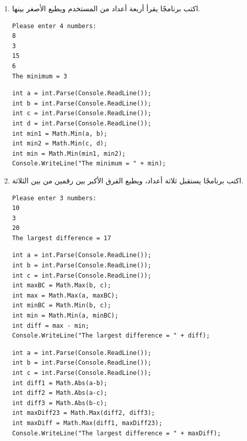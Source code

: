 \documentclass[14pt]{extarticle}
\begin{document}
\begin{enumerate}[itemsep=3em]
    \item
    اكتب برنامجًا يقرأ أربعة أعداد من المستخدم ويطبع الأصغر بينها.
    \ifdetailed
    \begin{boxExample}
    \begin{english}
    \begin{verbatim}
Please enter 4 numbers:
8
3
15
6
The minimum = 3
    \end{verbatim}
    \end{english}
    \end{boxExample}
    \ifwithsols
    \begin{boxSolution}
    \begin{english}
    \begin{verbatim}
int a = int.Parse(Console.ReadLine());
int b = int.Parse(Console.ReadLine());
int c = int.Parse(Console.ReadLine());
int d = int.Parse(Console.ReadLine());
int min1 = Math.Min(a, b);
int min2 = Math.Min(c, d);
int min = Math.Min(min1, min2);
Console.WriteLine("The minimum = " + min);
    \end{verbatim}
    \end{english}
    \end{boxSolution}
    \fi
\fi

    \item
    اكتب برنامجًا يستقبل ثلاثة أعداد، ويطبع الفرق الأكبر بين رقمين من بين الثلاثة.
    \ifdetailed
    \begin{boxExample}
    \begin{english}
    \begin{verbatim}
Please enter 3 numbers:
10
3
20
The largest difference = 17
    \end{verbatim}
    \end{english}
    \end{boxExample}
    \ifwithsols
    \begin{boxSolution}[1]
    \begin{english}
    \begin{verbatim}
int a = int.Parse(Console.ReadLine());
int b = int.Parse(Console.ReadLine());
int c = int.Parse(Console.ReadLine());
int maxBC = Math.Max(b, c);
int max = Math.Max(a, maxBC);
int minBC = Math.Min(b, c);
int min = Math.Min(a, minBC);
int diff = max - min;
Console.WriteLine("The largest difference = " + diff);
    \end{verbatim}
    \end{english}
    \end{boxSolution}
    \begin{boxSolution}[2]
    \begin{english}
    \begin{verbatim}
int a = int.Parse(Console.ReadLine());
int b = int.Parse(Console.ReadLine());
int c = int.Parse(Console.ReadLine());
int diff1 = Math.Abs(a-b);
int diff2 = Math.Abs(a-c);
int diff3 = Math.Abs(b-c);
int maxDiff23 = Math.Max(diff2, diff3);
int maxDiff = Math.Max(diff1, maxDiff23);
Console.WriteLine("The largest difference = " + maxDiff);
    \end{verbatim}
    \end{english}
    \end{boxSolution}
    \clearpage
    \fi
\fi


\end{enumerate}
\end{document}

